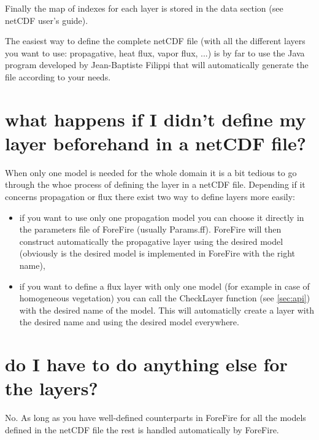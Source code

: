 Finally the map of indexes for each layer is stored in the data section (see netCDF user's guide).

\begin{center}
\end{center}

The easiest way to define the complete netCDF file (with all the different layers you want to use: propagative, heat flux, vapor flux, ...) is by far to use the Java program developed by Jean-Baptiste Filippi that will automatically generate the file according to your needs.

\section{what happens if I didn't define my layer beforehand in a netCDF file?}

When only one model is needed for the whole domain it is a bit tedious to go through the whoe process of defining the layer in a netCDF file. Depending if it concerns propagation or flux there exist two way to define layers more easily:
\begin{itemize}
	\item if you want to use only one propagation model you can choose it directly in the parameters file of ForeFire (usually Params.ff). ForeFire will then construct automatically the propagative layer using the desired model (obviously is the desired model is implemented in ForeFire with the right name),
	\item if you want to define a flux layer with only one model (for example in case of homogeneous vegetation) you can call the CheckLayer function (see \ref{sec:api}) with the desired name of the model. This will automaticlly create a layer with the desired name and using the desired model everywhere.
\end{itemize}

\section{do I have to do anything else for the layers?}

No. As long as you have well-defined counterparts in ForeFire for all the models defined in the netCDF file the rest is handled automatically by ForeFire.


